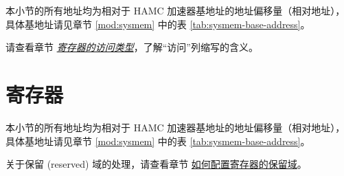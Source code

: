 \documentclass[main\_\_CN.tex]{subfiles}
\begin{document}
本小节的所有地址均为相对于 HAMC 加速器基地址的地址偏移量（相对地址），具体基地址请见章节 \ref{mod:sysmem} \textit{} 中的表 \ref{tab:sysmem-base-address}。

请查看章节 \hyperref[glossary-access-types]{\textit{寄存器的访问类型}}，了解“访问”列缩写的含义。






\newpage
\section{寄存器}

本小节的所有地址均为相对于 HAMC 加速器基地址的地址偏移量（相对地址），具体基地址请见章节 \ref{mod:sysmem} \textit{} 中的表 \ref{tab:sysmem-base-address}。

关于保留 (reserved) 域的处理，请查看章节 \hyperref[programming-reserved-field]{如何配置寄存器的保留域}。


\end{document}
